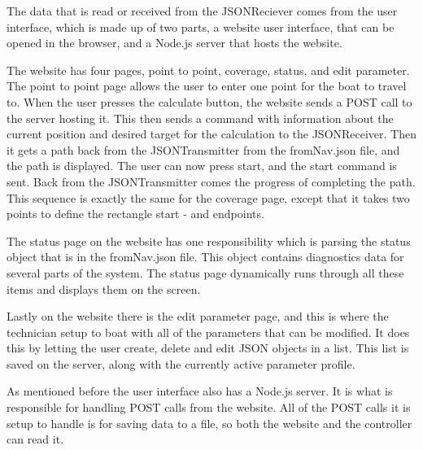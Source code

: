 The data that is read or received from the JSONReciever comes from the user interface, which is made up of two parts, a website user interface, that can be opened in the browser, and a Node.js server that hosts the website. 

The website has four pages, point to point, coverage, status, and edit parameter. The point to point page allows the user to enter one point for the boat to travel to. When the user presses the calculate button, the website sends a POST call to the server hosting it. This then sends a command with information about the current position and desired target for the calculation to the JSONReceiver. Then it gets a path back from the JSONTransmitter from the fromNav.json file, and the path is displayed. The user can now press start, and the start command is sent. Back from the JSONTransmitter comes the progress of completing the path. This sequence is exactly the same for the coverage page, except that it takes two points to define the rectangle start - and endpoints. 

The status page on the website has one responsibility which is parsing the status object that is in the fromNav.json file. This object contains diagnostics data for several parts of the system. The status page dynamically runs through all these items and displays them on the screen.

Lastly on the website there is the edit parameter page, and this is where the technician setup to boat with all of the parameters that can be modified. It does this by letting the user create, delete and edit JSON objects in a list. This list is saved on the server, along with the currently active parameter profile. 

As mentioned before the user interface also has a Node.js server\cite{nodejs}. It is what is responsible for handling POST calls from the website. All of the POST calls it is setup to handle is for saving data to a file, so both the website and the controller can read it.




